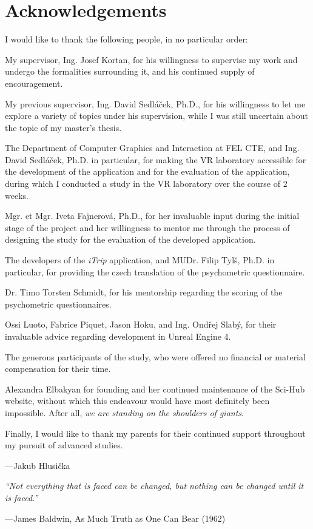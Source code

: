\chapter*{Acknowledgements}
I would like to thank the following people, in no particular order:

My supervisor, Ing. Josef Kortan, for his willingness to supervise my work and undergo the formalities surrounding it, and his continued supply of encouragement.

My previous supervisor, Ing. David Sedláček, Ph.D., for his willingness to let me explore a variety of topics under his supervision, while I was still uncertain about the topic of my master's thesis.

The Department of Computer Graphics and Interaction at FEL CTE, and Ing. David Sedláček, Ph.D. in particular, for making the VR laboratory accessible for the development of the application and for the evaluation of the application, during which I conducted a study in the VR laboratory over the course of 2 weeks.

Mgr. et Mgr. Iveta Fajnerová, Ph.D., for her invaluable input during the initial stage of the project and her willingness to mentor me through the process of designing the study for the evaluation of the developed application.

The developers of the \textit{iTrip} application, and MUDr. Filip Tylš, Ph.D. in particular, for providing the czech translation of the psychometric questionnaire.

Dr. Timo Torsten Schmidt, for his mentorship regarding the scoring of the psychometric questionnaires.

Ossi Luoto, Fabrice Piquet, Jason Hoku, and Ing. Ondřej Slabý, for their invaluable advice regarding development in Unreal Engine 4.

The generous participants of the study, who were offered no financial or material compensation for their time.

Alexandra Elbakyan for founding and her continued maintenance of the Sci-Hub website, without which this endeavour would have most definitely been impossible. After all, \textit{we are standing on the shoulders of giants}.

Finally, I would like to thank my parents for their continued support throughout my pursuit of advanced studies.

\begin{flushright}
---Jakub Hlusička
\end{flushright}

\vfill
\begin{center}
{\large
\textit{``Not everything that is faced can be changed, but nothing can be changed until it is faced.''}
}
\end{center}
\begin{flushright}
    ---James Baldwin, As Much Truth as One Can Bear (1962)
\end{flushright}

